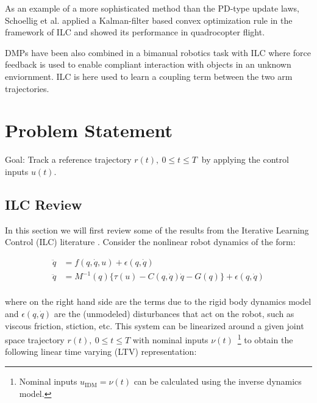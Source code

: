 \documentclass[10pt,a4paper]{article}
\newcommand{\joint}{q} %
\newcommand{\traj}{r} %
\newcommand{\dist}{\epsilon} %
\newcommand{\sysInput}{u} %
\newcommand{\dynamics}{f}
\begin{document}
As an example of a more sophisticated method than the PD-type update laws, Schoellig et al. \cite{Schoellig12} applied a Kalman-filter based convex optimization rule in the framework of ILC and showed its performance in quadrocopter flight.

DMPs have been also combined in a bimanual robotics task with ILC \cite{Gams13} where force feedback is used to enable compliant interaction with objects in an unknown enviornment. ILC is here used to learn a coupling term between the two arm trajectories. 


\section{Problem Statement}

Goal: Track a reference trajectory $\traj(t), \ 0 \leq t \leq T \ $ by applying the control inputs $\sysInput(t)$.

\subsection{ILC Review}

In this section we will first review some of the results from the Iterative Learning Control (ILC) literature \cite{Bristow06}. Consider the nonlinear robot dynamics of the form:

\begin{equation}
\begin{aligned}
\ddot{\joint} &= \dynamics(\joint,\dot{\joint},\sysInput) + \dist(\joint,\dot{\joint})\\
\ddot{\joint} &= M^{-1}(\joint)\{ \tau(\sysInput) - C(\joint,\dot{\joint})\dot{\joint} - G(\joint)\} + \dist(\joint,\dot{\joint})\\
\end{aligned}
\label{dynamics}
\end{equation}

where on the right hand side are the terms due to the rigid body dynamics model and $\dist(\joint,\dot{\joint})$ are the (unmodeled) disturbances that act on the robot, such as viscous friction, stiction, etc. This system can be linearized around a given joint space trajectory $\traj(t), \ 0 \leq t \leq T$ with nominal inputs $\nu(t)$~\footnote{Nominal inputs $\sysInput_{\text{IDM}} = \nu(t)$ can be calculated using the inverse dynamics model.} to obtain the following linear time varying (LTV) representation:
\end{document}

